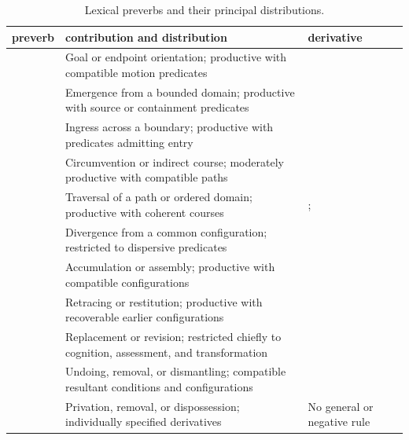 \begin{table}[htbp]
  \footnotesize
  \caption{Lexical preverbs and their principal distributions.}\label{tab:lexical-preverbs}
  \begin{tabularx}{\textwidth}{l L L}
    \toprule
    {\sc preverb} & {\sc contribution and distribution} & {\sc derivative} \\
    \midrule
     & Goal or endpoint orientation; productive with compatible motion predicates
      &   \\
     & Emergence from a bounded domain; productive with source or containment predicates
      &   \\
     & Ingress across a boundary; productive with predicates admitting entry
      &   \\
     & Circumvention or indirect course; moderately productive with compatible paths
      &   \\
     & Traversal of a path or ordered domain; productive with coherent courses
      &  ;   \\
     & Divergence from a common configuration; restricted to dispersive predicates
      &   \\
     & Accumulation or assembly; productive with compatible configurations
      &   \\
     & Retracing or restitution; productive with recoverable earlier configurations
      &   \\
     & Replacement or revision; restricted chiefly to cognition, assessment, and transformation
      &   \\
     & Undoing, removal, or dismantling; compatible resultant conditions and configurations
      &   \\
     & Privation, removal, or dispossession; individually specified derivatives
      & No general  or negative rule \\
    \bottomrule
  \end{tabularx}
\end{table}

